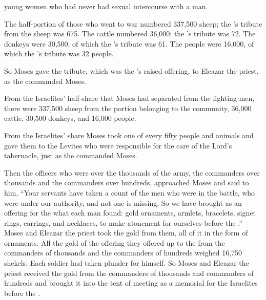 {young women
who
had never
had sexual intercourse
with a man.
\par }{\PP {}The half-portion
of those who went
to war
numbered
337,500
sheep;
the
{}’s
tribute
from
the sheep
was 675.
The cattle
numbered 36,000;
the
{}’s
tribute
was 72.
The donkeys
were 30,500,
of which the
{}’s
tribute
was 61.
The people
were 16,000,
of which the
{}’s
tribute
was 32
people.
\par }{\PP {}So Moses
gave
the tribute,
which was the
{}’s
raised
offering, to Eleazar
the priest,
as
the {}
commanded
Moses.
\par }{\PP {}From the Israelites’
half-share
that
Moses
had
separated
from
the fighting
men,
there
were 337,500
sheep
from
the portion
belonging to the community,
36,000
cattle,
30,500
donkeys,
and 16,000
people.
\par }{\PP {}From the Israelites’
share
Moses
took
one
of
every fifty
people
and animals
and gave
them to the
Levites
who were responsible
for the care
of the Lord’s
tabernacle,
just
as the
{}
commanded
Moses.
\par }{\PP {}Then the officers who were over
the thousands
of the army,
the commanders
over thousands
and the commanders
over hundreds,
approached
Moses
and said
to
him, “Your servants
have taken
a count
of the men
who were in the battle,
who
were under our authority,
and not one
is missing.
So we have brought
as an offering
for the
{}
what
each man
found: gold
ornaments,
armlets,
bracelets,
signet rings,
earrings,
and necklaces,
to make atonement
for ourselves
before
the {}.”
Moses
and Eleazar
the priest
took
the gold
from them,
all
of it in the form
of ornaments.
All
the gold
of the offering
they offered up
to the
{}
from the commanders
of thousands
and the
commanders
of hundreds
weighed 16,750
shekels.
Each
soldier
had taken plunder for himself.
So
Moses
and Eleazar
the priest
received the gold
from the
commanders
of thousands
and commanders of hundreds
and brought
it into
the
tent
of meeting
as a memorial
for the Israelites
before
the {}.


}
